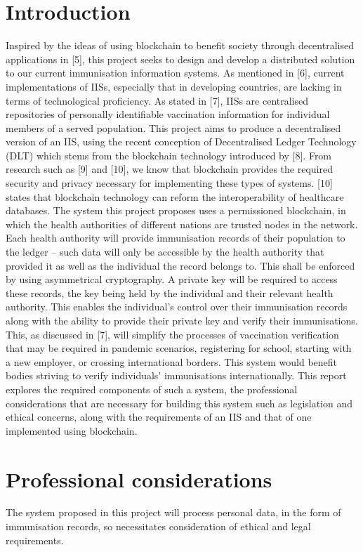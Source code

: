 \documentclass{report}
\begin{document}
\begin{flushleft}
\chapter{Introduction}
Inspired by the ideas of using blockchain to benefit society
through decentralised applications in [5], this project seeks to
design and develop a distributed solution to our current
immunisation information systems. As mentioned in [6],
current implementations of IISs, especially that in developing
countries, are lacking in terms of technological proficiency.
As stated in [7], IISs are centralised repositories of personally
identifiable vaccination information for individual members of
a served population. This project aims to produce a
decentralised version of an IIS, using the recent conception of
Decentralised Ledger Technology (DLT) which stems from
the blockchain technology introduced by [8]. From research
such as [9] and [10], we know that blockchain provides the
required security and privacy necessary for implementing
these types of systems. [10] states that blockchain technology
can reform the interoperability of healthcare databases.
The system this project proposes uses a permissioned
blockchain, in which the health authorities of different nations
are trusted nodes in the network. Each health authority will
provide immunisation records of their population to the ledger
– such data will only be accessible by the health authority that
provided it as well as the individual the record belongs to.
This shall be enforced by using asymmetrical cryptography. A
private key will be required to access these records, the key
being held by the individual and their relevant health
authority. This enables the individual’s control over their
immunisation records along with the ability to provide their
private key and verify their immunisations. This, as discussed
in [7], will simplify the processes of vaccination verification
that may be required in pandemic scenarios, registering for
school, starting with a new employer, or crossing international
borders. This system would benefit bodies striving to verify
individuals’ immunisations internationally.
This report explores the required components of such a
system, the professional considerations that are necessary for
building this system such as legislation and ethical concerns,
along with the requirements of an IIS and that of one
implemented using blockchain.


\chapter{Professional considerations}
The system proposed in this project will process personal data,
in the form of immunisation records, so necessitates
consideration of ethical and legal requirements.


\end{flushleft}
\end{document}
